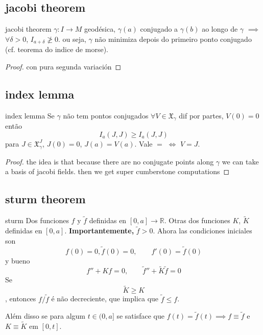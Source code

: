 \subsection{jacobi theorem}

\begin{thing6}{jacobi theorem}\leavevmode
\(\gamma:I \to M\) geodésica, \(\gamma(a)\) conjugado a \(\gamma(b)\) ao longo de \(\gamma\) \(\implies\) \(\forall \delta>0\), \(I_{a+\delta}\not \geq 0\). ou seja, \(\gamma\) não minimiza depois do primeiro ponto conjugado (cf. teorema do indice de morse).
\end{thing6}
\begin{proof}\leavevmode
con pura segunda variación
\end{proof}

\subsection{index lemma}

\begin{thing6}{index lemma}\leavevmode
Se \(\gamma\) não tem pontos conjugados \(\forall V \in \mathfrak{X}_\gamma\) dif por partes, \(V(0)=0\) então
	\[\boxed{I_a(J,J) \geq I_a(J,J)}\]
para \(J \in \mathfrak{X}^J_\gamma\), \(J(0)=0\), \(J(a)=V(a)\). Vale \(=\) \(\iff\) \(V=J\).
\end{thing6}
\begin{proof}\leavevmode
the idea is that because there are no conjugate points along \(\gamma\) we can take a basis of jacobi fields. then we get super cumberstone computations
\end{proof}

\subsection{sturm theorem}

\begin{thing6}{sturm}\leavevmode
	Dos funciones \(f\) y \(\tilde{f}\) definidas en \([0,a] \to \mathbb{R}\).
	Otras dos funciones \(K\), \(\tilde{K}\) definidas en \([0,a]\). \textbf{Importantemente,} \(\tilde{f}>0\). Ahora las condiciones iniciales son
	\[f(0)=0, \tilde{f}(0)=0, \qquad f'(0)=\tilde{f}(0)\]
y bueno
\[f''+Kf=0, \qquad  \tilde{f}''+\tilde{K}\tilde{f}=0\]
Se \[\tilde{K} \geq K\], entonces \(f/\tilde{f}\) é não decreciente, que implica que \(\tilde{f} \leq  f\).

Além disso se para algum \(t \in (0,a]\) se satisface que \(f(t)=\tilde{f}(t) \implies  f\equiv\tilde{f}\) e \(K\equiv\tilde{K}\) em \([0,t]\).
\end{thing6}

